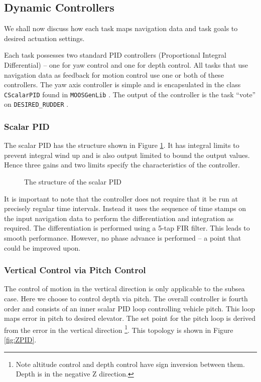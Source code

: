 \documentclass[a4paper,10pt]{article}
\newcommand{\Code}[1]{\texttt{#1} }
\newcommand{\code}[1]{\Code{#1} }
\begin{document}
\subsection{Dynamic Controllers}
We shall now discuss how each task maps navigation data and task
goals to desired actuation settings.

Each task possesses two standard PID controllers (Proportional
Integral Differential) -- one for yaw control and one for depth
control. All tasks that use navigation data as feedback for motion
control use one or both of these controllers. The yaw axis
controller is simple and is encapsulated in the class
\code{CScalarPID} found in \code{MOOSGenLib}. The output of the
controller is the task ``vote'' on \code{DESIRED\_RUDDER}.

\subsubsection{Scalar PID}
The scalar PID has the structure shown in Figure
\ref{fig:ScalarPID}. It has integral limits to prevent integral
wind up and is also output limited to bound the output values.
Hence three gains and two limits specify the characteristics of
the controller.

\begin{figure}[ht]
 \centering
{} \caption{The
structure of the scalar PID}
\label{fig:ScalarPID}

\end{figure}

It is important to note that the controller does not require that
it be run at precisely regular time intervals. Instead it uses the
sequence of time stamps on the input navigation data to perform
the differentiation and integration as required. The
differentiation is performed using a 5-tap FIR filter. This leads
to smooth performance. However, no phase advance is performed -- a
point that could be improved upon.

\subsubsection{Vertical Control via Pitch Control}
The control of motion in the vertical direction is only applicable
to the subsea case. Here we choose to control depth via pitch. The
overall controller is fourth order and consists of an inner scalar
PID loop controlling vehicle pitch. This loop maps error in pitch
to desired elevator.  The set point for the pitch loop is derived
from the error in the vertical direction \footnote{Note altitude
control and depth control have sign inversion between them. Depth
is in the negative Z direction.}. This topology is shown in Figure
\ref{fig:ZPID}.
\end{document}
